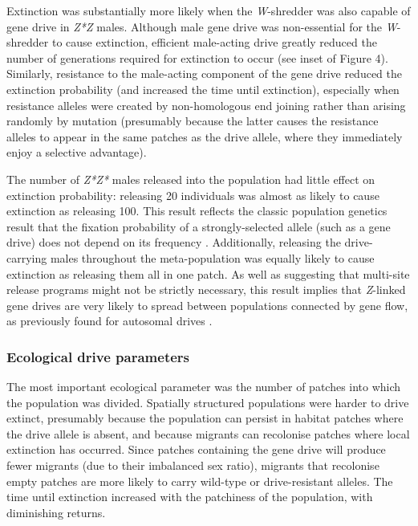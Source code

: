 \documentclass[]{rsos}%
\begin{document}
Extinction was substantially more likely when the \emph{W}-shredder was
also capable of gene drive in \emph{Z*Z} males. Although male gene drive
was non-essential for the \emph{W}-shredder to cause extinction,
efficient male-acting drive greatly reduced the number of generations
required for extinction to occur (see inset of Figure 4). Similarly,
resistance to the male-acting component of the gene drive reduced the
extinction probability (and increased the time until extinction),
especially when resistance alleles were created by non-homologous end
joining rather than arising randomly by mutation (presumably because the
latter causes the resistance alleles to appear in the same patches as
the drive allele, where they immediately enjoy a selective advantage).

The number of \emph{Z*Z*} males released into the population had little
effect on extinction probability: releasing 20 individuals was almost as
likely to cause extinction as releasing 100. This result reflects the
classic population genetics result that the fixation probability of a
strongly-selected allele (such as a gene drive) does not depend on its
frequency \citep[only on selection and population structure; reviewed
in][]{patwa2008fix}. Additionally, releasing the drive-carrying males
throughout the meta-population was equally likely to cause extinction as
releasing them all in one patch. As well as suggesting that multi-site
release programs might not be strictly necessary, this result implies
that \emph{Z}-linked gene drives are very likely to spread between
populations connected by gene flow, as previously found for autosomal
drives \citep{noble2018cu}.

\hypertarget{ecological-drive-parameters}{%
\subsubsection{Ecological drive
parameters}\label{ecological-drive-parameters}}

The most important ecological parameter was the number of patches into
which the population was divided. Spatially structured populations were
harder to drive extinct, presumably because the population can persist
in habitat patches where the drive allele is absent, and because
migrants can recolonise patches where local extinction has occurred.
Since patches containing the gene drive will produce fewer migrants (due
to their imbalanced sex ratio), migrants that recolonise empty patches
are more likely to carry wild-type or drive-resistant alleles. The time
until extinction increased with the patchiness of the population, with
diminishing returns.
\end{document}
